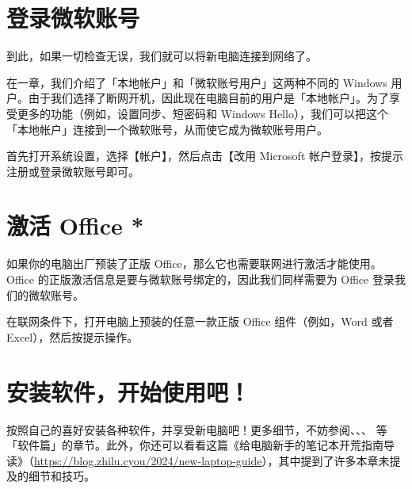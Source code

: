 \section{登录微软账号}

到此，如果一切检查无误，我们就可以将新电脑连接到网络了。

在一章，我们介绍了「本地帐户」和「微软账号用户」这两种不同的 Windows 用户。由于我们选择了断网开机，因此现在电脑目前的用户是「本地帐户」。为了享受更多的功能（例如，设置同步、短密码和 Windows Hello），我们可以把这个「本地帐户」连接到一个微软账号，从而使它成为微软账号用户。

首先打开系统设置，选择【帐户】，然后点击【改用 Microsoft 帐户登录】，按提示注册或登录微软账号即可。

\section{激活 Office *}

如果你的电脑出厂预装了正版 Office，那么它也需要联网进行激活才能使用。Office 的正版激活信息是要与微软账号绑定的，因此我们同样需要为 Office 登录我们的微软账号。

在联网条件下，打开电脑上预装的任意一款正版 Office 组件（例如，Word 或者 Excel），然后按提示操作。

\section{安装软件，开始使用吧！}

按照自己的喜好安装各种软件，并享受新电脑吧！更多细节，不妨参阅、、、 等「软件篇」的章节。此外，你还可以看看这篇《给电脑新手的笔记本开荒指南导读》（\url{https://blog.zhilu.cyou/2024/new-laptop-guide}），其中提到了许多本章未提及的细节和技巧。
